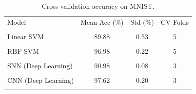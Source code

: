 \begin{table}[h]
\centering
\caption{Cross-validation accuracy on MNIST.}
\label{tab:results}
\begin{tabular}{lccc}
\toprule
Model & Mean Acc (\%) & Std (\%) & CV Folds \\\\
\midrule
Linear SVM & 89.88 & 0.53 & 5 \\\\
RBF SVM & 96.98 & 0.22 & 5 \\\\
SNN (Deep Learning) & 90.98 & 0.08 & 3 \\\\
CNN (Deep Learning) & 97.62 & 0.20 & 3 \\\\
\bottomrule
\end{tabular}
\end{table}
